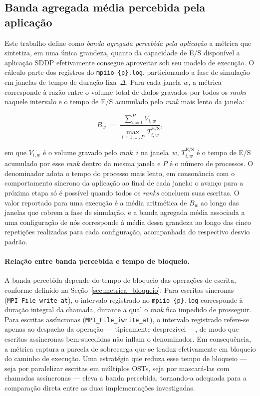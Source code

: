 \subsection{Banda agregada média percebida pela aplicação}
\label{sec:metrica_banda_percebida}

Este trabalho define como \textit{banda agregada percebida pela
aplicação} a métrica que sintetiza, em uma única grandeza, quanto da
capacidade de E/S disponível a aplicação SDDP efetivamente consegue
aproveitar sob seu modelo de execução. O cálculo parte dos registros do \texttt{mpiio-\{p\}.log},
particionando a fase de simulação em janelas de tempo de duração
fixa~$\Delta$. Para cada janela $w$, a métrica corresponde à razão entre o
volume total de dados gravados por todos os \textit{ranks} naquele intervalo
e o tempo de E/S acumulado pelo \textit{rank} mais lento da janela:

\[
B_w \;=\; \frac{\displaystyle\sum_{i=1}^{P} V_{i,w}}{\displaystyle\max_{i=1,\ldots,P}\, T_{i,w}^{\text{E/S}}},
\]

\noindent em que $V_{i,w}$ é o volume gravado pelo \textit{rank}~$i$ na
janela~$w$, $T_{i,w}^{\text{E/S}}$ é o tempo de E/S acumulado por esse
\textit{rank} dentro da mesma janela e $P$ é o número de processos. O
denominador adota o tempo do processo mais lento, em consonância com o
comportamento síncrono da aplicação ao final de cada janela: o avanço
para a próxima etapa só é possível quando todos os \textit{ranks}
concluem suas escritas. O valor reportado para uma execução é a média
aritmética de $B_w$ ao longo das janelas que cobrem a fase de
simulação, e a banda agregada média associada a uma configuração de nós
corresponde à média dessa grandeza ao longo das cinco repetições
realizadas para cada configuração, acompanhada do respectivo desvio
padrão.

\paragraph{Relação entre banda percebida e tempo de bloqueio.}
A banda percebida depende do tempo de bloqueio das
operações de escrita, conforme definido na
Seção~\ref{sec:metrica_bloqueio}. Para escritas síncronas
(\texttt{MPI\_File\_write\_at}), o intervalo registrado no
\texttt{mpiio-\{p\}.log} corresponde à duração integral da chamada,
durante a qual o \textit{rank} fica impedido de prosseguir. Para
escritas assíncronas (\texttt{MPI\_File\_iwrite\_at}), o intervalo
registrado refere-se apenas ao despacho da operação --- tipicamente
desprezível ---, de modo que escritas assíncronas bem-sucedidas não
inflam o denominador. Em consequência, a métrica captura a parcela de
sobrecarga que se traduz efetivamente em bloqueio do caminho de
execução. Uma estratégia que reduza esse tempo de bloqueio --- seja
por paralelizar escritas em múltiplos OSTs, seja por mascará-las com
chamadas assíncronas --- eleva a banda percebida, tornando-a adequada
para a comparação direta entre as duas implementações investigadas.